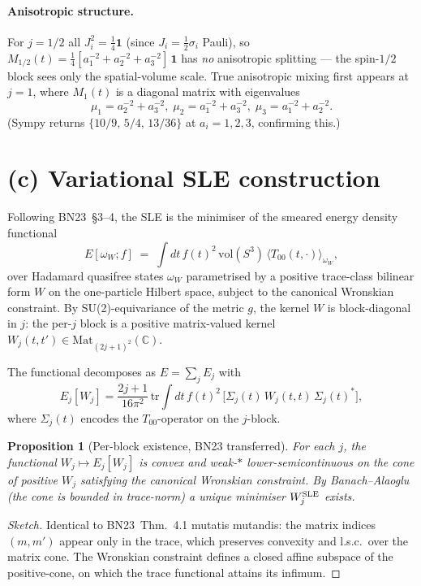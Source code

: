 \documentclass[11pt,a4paper]{article}
\newtheorem{proposition}[theorem]{Proposition}
\theoremstyle{definition}
\begin{document}
\paragraph{Anisotropic structure.} For $j=1/2$ all $J_i^2 = \tfrac14
\mathbf 1$ (since $J_i = \tfrac12\sigma_i$ Pauli), so $M_{1/2}(t) =
\tfrac14[a_1^{-2}+a_2^{-2}+a_3^{-2}]\,\mathbf 1$ has \emph{no} anisotropic
splitting --- the spin-$1/2$ block sees only the spatial-volume scale.
True anisotropic mixing first appears at $j=1$, where $M_1(t)$ is a
diagonal matrix with eigenvalues
\[
  \mu_1 = a_2^{-2}+a_3^{-2},\;
  \mu_2 = a_1^{-2}+a_3^{-2},\;
  \mu_3 = a_1^{-2}+a_2^{-2}.
\]
(Sympy returns $\{10/9,\,5/4,\,13/36\}$ at $a_i=1,2,3$, confirming
this.)

\section{(c) Variational SLE construction}

Following BN23~\S 3--4, the SLE is the minimiser of the smeared energy
density functional
\[
  E[\omega_W; f] \;=\; \int dt\,f(t)^2\,\mathrm{vol}(S^3)\,
  \langle T_{00}(t,\cdot)\rangle_{\omega_W},
\]
over Hadamard quasifree states $\omega_W$ parametrised by a positive
trace-class bilinear form $W$ on the one-particle Hilbert space, subject
to the canonical Wronskian constraint. By SU(2)-equivariance of the
metric $g$, the kernel $W$ is block-diagonal in $j$: the per-$j$
block is a positive matrix-valued kernel
$W_j(t,t')\in\mathrm{Mat}_{(2j+1)^2}(\mathbb C)$.

The functional decomposes as $E = \sum_j E_j$ with
\[
  E_j[W_j] = \frac{2j+1}{16\pi^2}\,\mathrm{tr}\!\!\int dt\,f(t)^2\,
  \big[\Sigma_j(t)\,W_j(t,t)\,\Sigma_j(t)^*\big],
\]
where $\Sigma_j(t)$ encodes the $T_{00}$-operator on the $j$-block.

\begin{proposition}[Per-block existence, BN23 transferred]
For each $j$, the functional $W_j\mapsto E_j[W_j]$ is convex and weak-$*$
lower-semicontinuous on the cone of positive $W_j$ satisfying the
canonical Wronskian constraint. By Banach--Alaoglu (the cone is bounded
in trace-norm) a unique minimiser $W_j^{\rm SLE}$ exists.
\end{proposition}

\begin{proof}[Sketch]
Identical to BN23~Thm.~4.1 mutatis mutandis: the matrix indices $(m,m')$
appear only in the trace, which preserves convexity and l.s.c.\ over
the matrix cone. The Wronskian constraint defines a closed affine subspace
of the positive-cone, on which the trace functional attains its
infimum.
\end{proof}
\end{document}
